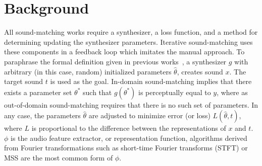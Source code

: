 \documentclass[runningheads]{llncs}
\begin{document}
\section{Background}
All sound-matching works require a synthesizer, a loss function, and a method for determining updating the synthesizer parameters. Iterative sound-matching uses these components in a feedback loop which imitates the manual approach. To paraphrase the formal definition given in previous works~\cite{salimi2025soundmatching,vahidi2023mesostructures,han2023perceptual}, a synthesizer $g$ with arbitrary (in this case, random) initialized parameters $\hat{\theta}$, creates sound $x$. The target sound $t$ is used as the goal. In-domain sound-matching implies that there exists a parameter set $\theta^*$ such that $g(\theta^*)$ is perceptually equal to $y$, where as out-of-domain sound-matching requires that there is no such set of parameters. In any case, the parameters $\hat{\theta}$ are adjusted to minimize error (or loss) $L(\hat{\theta},t)$, where $L$ is proportional to the difference between the representations of $x$ and $t$. $\phi$ is the audio feature extractor, or representation function, algorithms derived from Fourier transformations such as short-time Fourier transforms (STFT) or MSS are the most common form of $\phi$.

\end{document}
